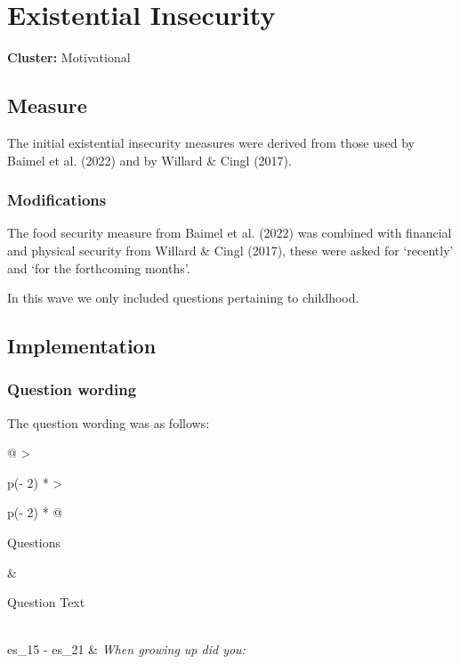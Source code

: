 \documentclass[
  letterpaper,
]{scrbook}
\begin{document}
\section{}\label{section}

\chapter{Existential Insecurity}\label{existential-insecurity}

\textbf{Cluster:} Motivational

\section{Measure}\label{measure-4}

The initial existential insecurity measures were derived from those used
by Baimel et al. (2022) and by Willard \& Cingl (2017).

\subsection*{Modifications}\label{modifications-4}

The food security measure from Baimel et al. (2022) was combined with
financial and physical security from Willard \& Cingl (2017), these were
asked for `recently' and `for the forthcoming months'.

In this wave we only included questions pertaining to childhood.

\section{Implementation}\label{implementation-4}

\subsection*{Question wording}\label{question-wording-4}

The question wording was as follows:

\begin{longtable}[]{@{}
  >{\raggedright\arraybackslash}p{(\columnwidth - 2\tabcolsep) * }
  >{\raggedright\arraybackslash}p{(\columnwidth - 2\tabcolsep) * }@{}}
\toprule\noalign{}
\begin{minipage}[b]{\linewidth}\raggedright
Questions
\end{minipage} & \begin{minipage}[b]{\linewidth}\raggedright
Question Text
\end{minipage} \\
\midrule\noalign{}
\endhead
\bottomrule\noalign{}
\endlastfoot
es\_15 - es\_21 & \emph{When growing up did you:} \\
\end{longtable}
\end{document}
